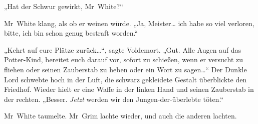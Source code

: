 „Hat der Schwur gewirkt, Mr~White?“

Mr~White klang, als ob er weinen würde.
„Ja, Meister… ich habe so viel verloren, bitte, ich bin schon genug bestraft worden.“

„Kehrt auf eure Plätze zurück…“, sagte Voldemort.
„Gut. Alle Augen auf das Potter-Kind, bereitet euch darauf vor, sofort zu schießen, wenn er versucht zu fliehen oder seinen Zauberstab zu heben oder ein Wort zu sagen…“
Der Dunkle Lord schwebte hoch in der Luft, die schwarz gekleidete Gestalt überblickte den Friedhof. Wieder hielt er eine Waffe in der linken Hand und seinen Zauberstab in der rechten.
„Besser. \emph{Jetzt} werden wir den Jungen-der-überlebte töten.“

Mr~White taumelte. Mr~Grim lachte wieder, und auch die anderen lachten.

